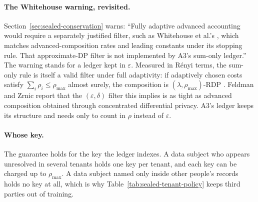 \paragraph{The Whitehouse warning, revisited.}
Section~\ref{sec:sealed-conservation} warns: ``Fully adaptive advanced
accounting would require a separately justified filter, such as Whitehouse et
al.'s , which matches advanced-composition rates and leading constants under
its stopping rule. That approximate-DP filter is not implemented by A3's
sum-only ledger.'' The warning stands for a ledger kept in $\varepsilon$.
Measured in R\'enyi terms, the sum-only rule is itself a valid filter under
full adaptivity: if adaptively chosen costs satisfy $\sum_i\rho_i\le\rho_{\max}$ almost
surely, the composition is $(\lambda,\rho_{\max})$-RDP .
Feldman and Zrnic report that the $(\varepsilon,\delta)$ filter this implies
is as tight as advanced composition obtained through concentrated
differential privacy. A3's ledger keeps its structure and needs only to
count in $\rho$ instead of $\varepsilon$.

\paragraph{Whose key.}
The guarantee holds for the key the ledger indexes. A data subject who appears
unresolved in several tenants holds one key per tenant, and each key can be
charged up to $\rho_{\max}$. A data
subject named only inside other people's records holds no key at all, which is why
Table~\ref{tab:sealed-tenant-policy} keeps third parties out of training.

